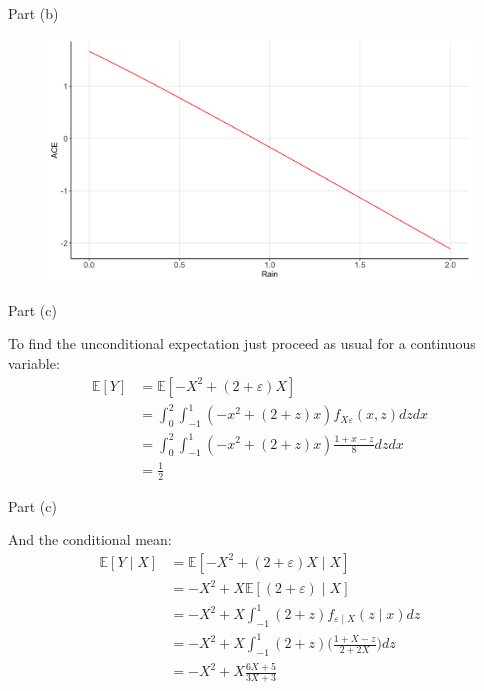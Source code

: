 \begin{frame}{Part (b)}

    \begin{figure}[ht]
        \centering
        \includegraphics[width=1.0\linewidth]{./resources/question-1-b.png}
    \end{figure}

\end{frame}

\begin{frame}{Part (c)}

    To find the unconditional expectation just proceed as usual for a continuous variable:
    \begin{align*}
        \mathbb{E}[Y] &= \mathbb{E}[-X^2 + (2 + \varepsilon) X]
        \\
        &= \int_0^2 \int_{-1}^1 (-x^2 + (2 + z) x) f_{X \varepsilon}(x, z) dz dx
        \\
        &= \int_0^2 \int_{-1}^1 (-x^2 + (2 + z) x) \frac{1 + x - z}{8} dz dx
        \\
        &= \frac{1}{2}
    \end{align*}

\end{frame}

\begin{frame}{Part (c)}

    And the conditional mean:
    \begin{align*}
        \mathbb{E}[Y \mid X] &= \mathbb{E}[-X^2 + (2 + \varepsilon) X \mid X]
        \\
        &= -X^2 + X \mathbb{E}[ (2 + \varepsilon) \mid X]
        \\
        &= -X^2 + X \int_{-1}^1 (2 + z) f_{\varepsilon \mid X}(z \mid x) dz
        \\
        &= -X^2 + X \int_{-1}^1 (2 + z) \Biggr( \frac{1 + X - z}{2 + 2X} \Biggr) dz
        \\
        &= -X^2 + X \frac{6X  + 5}{3X + 3}
    \end{align*}

\end{frame}

